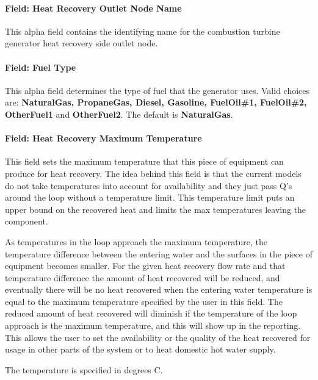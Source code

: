 \paragraph{Field: Heat Recovery Outlet Node Name}\label{field-heat-recovery-outlet-node-name-1}

This alpha field contains the identifying name for the combustion turbine generator heat recovery side outlet node.

\paragraph{Field: Fuel Type}\label{field-fuel-type-1}

This alpha field determines the type of fuel that the generator uses. Valid choices are: \textbf{NaturalGas, PropaneGas, Diesel, Gasoline, FuelOil\#1, FuelOil\#2, OtherFuel1} and \textbf{OtherFuel2}. The default is \textbf{NaturalGas}.

\paragraph{Field: Heat Recovery Maximum Temperature}\label{field-heat-recovery-maximum-temperature-1}

This field sets the maximum temperature that this piece of equipment can produce for heat recovery. The idea behind this field is that the current models do not take temperatures into account for availability and they just pass Q's around the loop without a temperature limit. This temperature limit puts an upper bound on the recovered heat and limits the max temperatures leaving the component.

As temperatures in the loop approach the maximum temperature, the temperature difference between the entering water and the surfaces in the piece of equipment becomes smaller. For the given heat recovery flow rate and that temperature difference the amount of heat recovered will be reduced, and eventually there will be no heat recovered when the entering water temperature is equal to the maximum temperature specified by the user in this field. The reduced amount of heat recovered will diminish if the temperature of the loop approach is the maximum temperature, and this will show up in the reporting. This allows the user to set the availability or the quality of the heat recovered for usage in other parts of the system or to heat domestic hot water supply.

The temperature is specified in degrees C.

